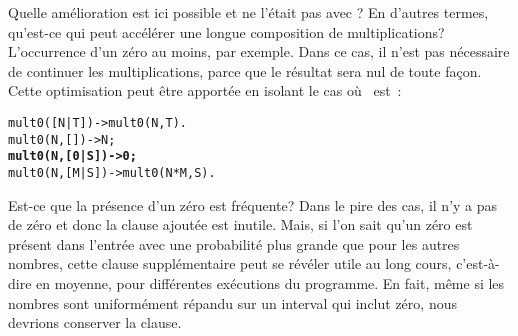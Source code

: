 Quelle amélioration est ici possible et ne l'était pas avec
? En d'autres termes, qu'est-ce qui peut accélérer une
longue composition de multiplications? L'occurrence d'un zéro au
moins, par exemple. Dans ce cas, il n'est pas nécessaire de continuer
les multiplications, parce que le résultat sera nul de toute
façon. Cette optimisation peut être apportée en isolant le cas où
~est~:
\begin{alltt}
mult0([N|T])   -> mult0(N,T).
mult0(N,   []) -> N;
\textbf{mult0(N,[0|S]) -> 0;}\hfill% \emph{Amélioration.}
mult0(N,[M|S]) -> mult0(N*M,S).
\end{alltt}
Est-ce que la présence d'un zéro est fréquente? Dans le pire des cas,
il n'y a pas de zéro et donc la clause ajoutée est inutile. Mais, si
l'on sait qu'un zéro est présent dans l'entrée avec une probabilité
plus grande que pour les autres nombres, cette clause supplémentaire
peut se révéler utile au long cours, c'est-à-dire en moyenne, pour
différentes exécutions du programme. En fait, même si les nombres sont
uniformément répandu sur un interval qui inclut zéro, nous devrions
conserver la clause.
\label{sec_tail_call_opt}


